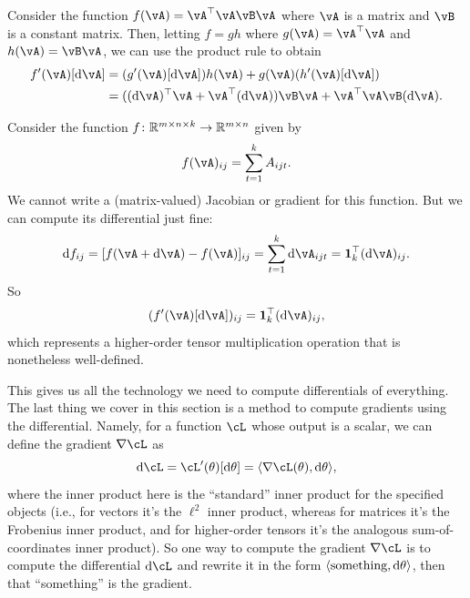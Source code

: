 \documentclass[../../book-main.tex]{subfiles}
\begin{document}
\begin{example}
    Consider the function \(f(\vA) = \vA^{\top}\vA\vB\vA\) where \(\vA\) is a matrix and \(\vB\) is a constant matrix. Then, letting \(f = gh\) where \(g(\vA) = \vA^{\top}\vA\) and \(h(\vA) = \vB\vA\), we can use the product rule to obtain 
    \begin{align}
        f^{\prime}(\vA)[\odif{\vA}]
        &= (g^{\prime}(\vA)[\odif{\vA}])h(\vA) + g(\vA)(h^{\prime}(\vA)[\odif{\vA}]) \\
        &= ((\odif{\vA})^{\top}\vA + \vA^{\top}(\odif{\vA}))\vB\vA + \vA^{\top}\vA\vB(\odif{\vA}).
    \end{align}
\end{example}

\begin{example}
    Consider the function \(f \colon \mathbb{R}^{m \times n \times k} \to \mathbb{R}^{m \times n}\) given by 
    \begin{equation}
        f(\vA)_{ij} = \sum_{t = 1}^{k}A_{ijt}.
    \end{equation}
    We cannot write a (matrix-valued) Jacobian or gradient for this function. But we can compute its differential just fine:
    \begin{equation}
        \odif{f}_{ij} = [f(\vA + \odif{\vA}) - f(\vA)]_{ij} = \sum_{t = 1}^{k}\odif{\vA}_{ijt} = \vone_{k}^{\top}(\odif{\vA})_{ij}.
    \end{equation}
    So 
    \begin{equation}
        (f^{\prime}(\vA)[\odif{\vA}])_{ij} = \vone_{k}^{\top}(\odif{\vA})_{ij},
    \end{equation}
    which represents a higher-order tensor multiplication operation that is nonetheless well-defined.
\end{example}

This gives us all the technology we need to compute differentials of everything. The last thing we cover in this section is a method to compute gradients using the differential. Namely, for a function \(\cL\) whose output is a scalar, we can define the gradient \(\nabla \cL\) as 
\begin{equation}
    \odif{\cL} = \cL^{\prime}(\theta)[\odif{\theta}] = \ip{\nabla \cL(\theta)}{\odif{\theta}},
\end{equation}
where the inner product here is the ``standard'' inner product for the specified objects (i.e., for vectors it's the \(\ell^{2}\) inner product, whereas for matrices it's the Frobenius inner product, and for higher-order tensors it's the analogous sum-of-coordinates inner product). So one way to compute the gradient \(\nabla \cL\) is to compute the differential \(\odif{\cL}\) and rewrite it in the form \(\ip{\text{something}}{\odif{\theta}}\), then that ``something'' is the gradient.
\end{document}
